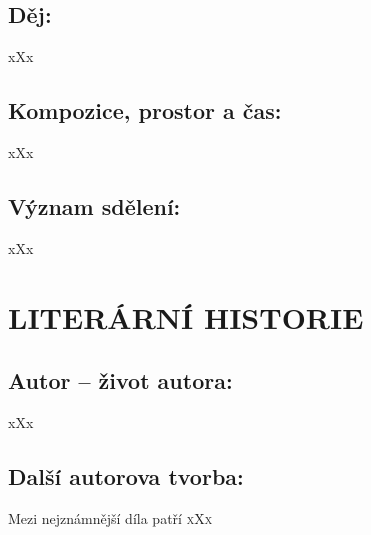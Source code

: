 \documentclass{extarticle} %
\begin{document}
\subsection*{Děj:}
\noindent 
xXx

\subsection*{Kompozice, prostor a čas:}
\noindent 
xXx

\subsection*{Význam sdělení:}
\noindent 
xXx

\section*{LITERÁRNÍ HISTORIE}





\subsection*{Autor {\ssmall -- život autora:}}
\noindent 
xXx


\subsection*{Další autorova tvorba:}
\noindent 
Mezi nejznámnější díla patří \textsc{xXx}
\end{document}
